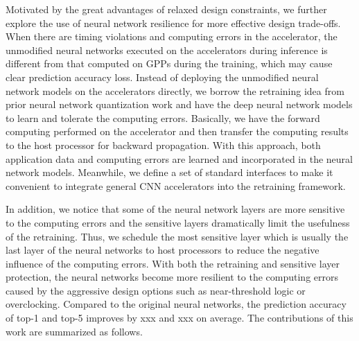 Motivated by the great advantages of relaxed design constraints,
we further explore the use of neural network resilience for more 
effective design trade-offs. When there are timing violations
and computing errors in the accelerator, the unmodified neural networks 
executed on the accelerators during inference is different 
from that computed on GPPs during the training, which may cause clear 
prediction accuracy loss. Instead of deploying the unmodified neural 
network models on the accelerators directly, we borrow the retraining 
idea from prior neural network quantization work \cite{Hwang2014_17,Matthieu2014_8} 
and have the deep neural network models to learn and tolerate the computing errors.  
Basically, we have the forward computing performed on the accelerator and 
then transfer the computing results to the host processor for 
backward propagation. With this approach, both application data and computing 
errors are learned and incorporated in the neural network models.  
Meanwhile, we define a set of standard interfaces to make it convenient 
to integrate general CNN accelerators into the retraining framework. 

In addition, we notice that some of the neural network layers are more sensitive to the 
computing errors and the sensitive layers dramatically limit the usefulness of the retraining. 
Thus, we schedule the most sensitive layer which is usually the last 
layer of the neural networks to host processors to reduce the negative influence 
of the computing errors. With both the retraining and sensitive layer protection, 
the neural networks become more resilient to the computing errors caused by 
the aggressive design options such as near-threshold logic or overclocking.
Compared to the original neural networks, the prediction accuracy of top-1 and top-5 
improves by xxx and xxx on average. The contributions of this work are 
summarized as follows.

